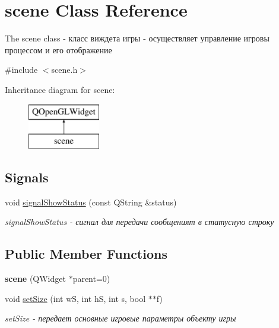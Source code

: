 \hypertarget{classscene}{}\section{scene Class Reference}
\label{classscene}


The scene class -\/ класс виждета игры -\/ осуществляет управление игровы процессом и его отображение  




{\ttfamily \#include $<$scene.\+h$>$}

Inheritance diagram for scene\+:\begin{figure}[H]
\begin{center}
\leavevmode
\includegraphics[height=2.000000cm]{classscene}
\end{center}
\end{figure}
\subsection*{Signals}
\begin{DoxyCompactItemize}
\item 
void \hyperlink{classscene_a63ee03bf6251756564be417b7ebd5ef5}{signal\+Show\+Status} (const Q\+String \&status)
\begin{DoxyCompactList}\small\item\em signal\+Show\+Status -\/ сигнал для передачи сообщеният в статусную строку \end{DoxyCompactList}\end{DoxyCompactItemize}
\subsection*{Public Member Functions}
\begin{DoxyCompactItemize}
\item 
\hypertarget{classscene_ac93fe52e7b2f23b16705b6cd79ab3d66}{}{\bfseries scene} (Q\+Widget $\ast$parent=0)\label{classscene_ac93fe52e7b2f23b16705b6cd79ab3d66}

\item 
void \hyperlink{classscene_a3a5609dc2e28d4541c5f2e10b5103ef3}{set\+Size} (int w\+S, int h\+S, int s, bool $\ast$$\ast$f)
\begin{DoxyCompactList}\small\item\em set\+Size -\/ передает основные игровые параметры объекту игры \end{DoxyCompactList}\end{DoxyCompactItemize}


